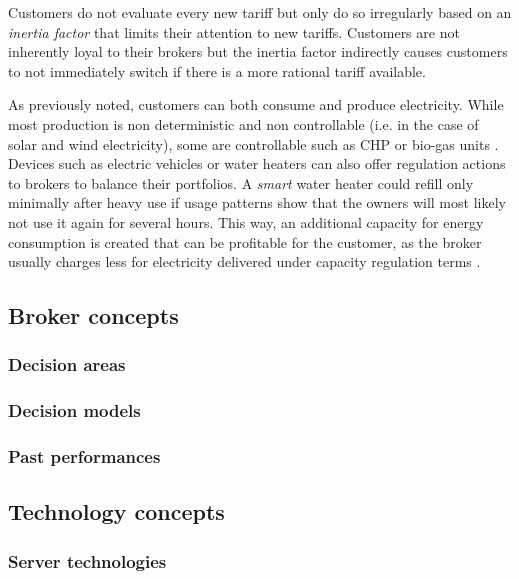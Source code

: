 Customers do not evaluate every new tariff but only do so irregularly based on an \emph{inertia factor} that limits their attention to new tariffs. Customers are not inherently loyal to their brokers but the inertia factor indirectly causes customers to not immediately switch if there is a more rational tariff available. 

As previously noted, customers can both consume and produce electricity. While most production is non deterministic and non controllable (i.e. in the case of solar and wind electricity), some are controllable such as \ac{CHP} or bio-gas units \citep[p.16]{ketter2018powertac}. Devices such as electric vehicles or water heaters can also offer regulation actions to brokers to balance their portfolios. A \emph{smart} water heater could refill only minimally after heavy use if usage patterns show that the owners will most likely not use it again for several hours. This way, an additional capacity for energy consumption is created that can be profitable for the customer, as the broker usually charges less for electricity delivered under capacity regulation terms \citep[p.14ff.]{ketter2018powertac}.

\subsection{Broker concepts}
\subsubsection{Decision areas}
\subsubsection{Decision models}
\subsubsection{Past performances}

\subsection{Technology concepts}
\subsubsection{Server technologies}


